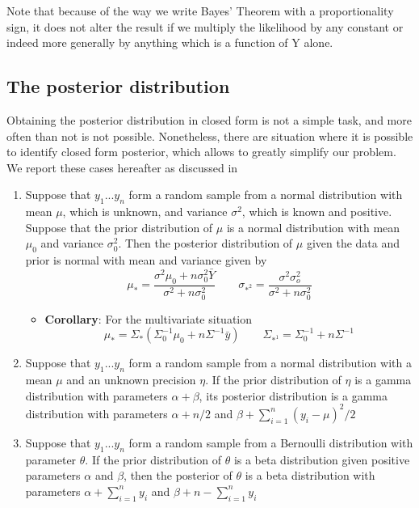 \documentclass[letterpaper]{article}
\begin{document}
	Note that because of the way we write Bayes’ Theorem with a proportionality sign, it does not alter the result if we multiply the likelihood by any constant or indeed more generally by anything which is a function of Y alone. 
	
	\subsection{The posterior distribution}
	Obtaining the posterior distribution in closed form is not a simple task, and more often than not is not possible.  Nonetheless, there are situation where it is possible to identify closed form posterior, which allows to greatly simplify our problem. We report these cases hereafter as discussed in \citet{tsay2002}
	
	\begin{enumerate}
		\item Suppose that $y_1...y_n$ form a random sample from a normal distribution with mean $\mu$, which is unknown, and variance $\sigma^2$, which is known and positive. Suppose that the prior distribution of $\mu$ is a normal distribution with mean $\mu_0$ and variance $\sigma_{0}^2$. Then the posterior distribution of $\mu$ given the data and prior is normal with mean and variance given by
		\begin{equation*}
		\mu_{*}=\frac{\sigma^2\mu_0+n\sigma_0^2 \bar{Y}}{\sigma^2 + n\sigma_0^2} \qquad \sigma_{*^2}=\frac{\sigma^2\sigma_o^2}{\sigma^2+n\sigma_0^2}
		\end{equation*}
		\begin{itemize}
			\item \textbf{Corollary}: For the multivariate situation
			\begin{equation}
			\mu_{*}=\Sigma_*\left( \Sigma_{0}^{-1}\mu_0+n\Sigma^{-1}\bar{y} \right) \qquad \Sigma_{*^1}=\Sigma_0^{-1}+n\Sigma^{-1}
			\end{equation}
		\end{itemize}
		\item Suppose that $y_1...y_n$ form a random sample from a normal distribution with a mean $\mu$ and an unknown precision $\eta$. If the prior distribution of $\eta$ is a gamma distribution with parameters $\alpha + \beta$, its posterior distribution is a gamma distribution with parameters $\alpha + n/2$ and $ \beta + \sum_{i=1}^{n} (y_i-\mu)^2/2 $
		
		\item Suppose that $y_1...y_n$ form a random sample from a Bernoulli distribution with parameter $\theta$. If the prior distribution of $\theta$ is a beta distribution given positive parameters $\alpha$ and $\beta$, then the posterior of $\theta$ is a beta distribution with parameters $\alpha + \sum_{i=1}^{n} y_i$ and $\beta + n - \sum_{i=1}^{n} y_i$ 
		

\end{enumerate}
\end{document}
